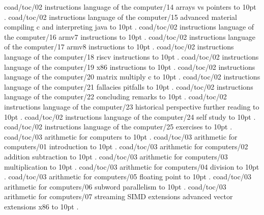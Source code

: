 coad/toc/02 instructions language of the computer/14 arrays vs pointers \leaders\hbox to 10pt {\hss.\hss}  \hfill {}
\smallskip
coad/toc/02 instructions language of the computer/15 advanced material compiling c and interpreting java \leaders\hbox to 10pt {\hss.\hss}  \hfill {}
\smallskip
coad/toc/02 instructions language of the computer/16 armv7 instructions \leaders\hbox to 10pt {\hss.\hss}  \hfill {}
\smallskip
coad/toc/02 instructions language of the computer/17 armv8 instructions \leaders\hbox to 10pt {\hss.\hss}  \hfill {}
\smallskip
coad/toc/02 instructions language of the computer/18 riscv instructions \leaders\hbox to 10pt {\hss.\hss}  \hfill {}
\smallskip
coad/toc/02 instructions language of the computer/19 x86 instructions \leaders\hbox to 10pt {\hss.\hss}  \hfill {}
\smallskip
coad/toc/02 instructions language of the computer/20 matrix multiply c \leaders\hbox to 10pt {\hss.\hss}  \hfill {}
\smallskip
coad/toc/02 instructions language of the computer/21 fallacies pitfalls \leaders\hbox to 10pt {\hss.\hss}  \hfill {}
\smallskip
coad/toc/02 instructions language of the computer/22 concluding remarks \leaders\hbox to 10pt {\hss.\hss}  \hfill {}
\smallskip
coad/toc/02 instructions language of the computer/23 historical perspective further reading \leaders\hbox to 10pt {\hss.\hss}  \hfill {}
\smallskip
coad/toc/02 instructions language of the computer/24 self study \leaders\hbox to 10pt {\hss.\hss}  \hfill {}
\smallskip
coad/toc/02 instructions language of the computer/25 exercises \leaders\hbox to 10pt {\hss.\hss}  \hfill {}
\smallskip
coad/toc/03 arithmetic for computers \leaders\hbox to 10pt {\hss.\hss}  \hfill {}
\smallskip
coad/toc/03 arithmetic for computers/01 introduction \leaders\hbox to 10pt {\hss.\hss}  \hfill {}
\smallskip
coad/toc/03 arithmetic for computers/02 addition subtraction \leaders\hbox to 10pt {\hss.\hss}  \hfill {}
\smallskip
coad/toc/03 arithmetic for computers/03 multiplication \leaders\hbox to 10pt {\hss.\hss}  \hfill {}
\smallskip
coad/toc/03 arithmetic for computers/04 division \leaders\hbox to 10pt {\hss.\hss}  \hfill {}
\smallskip
coad/toc/03 arithmetic for computers/05 floating point \leaders\hbox to 10pt {\hss.\hss}  \hfill {}
\smallskip
coad/toc/03 arithmetic for computers/06 subword parallelism \leaders\hbox to 10pt {\hss.\hss}  \hfill {}
\smallskip
coad/toc/03 arithmetic for computers/07 streaming SIMD extensions advanced vector extensions x86 \leaders\hbox to 10pt {\hss.\hss}  \hfill {}
